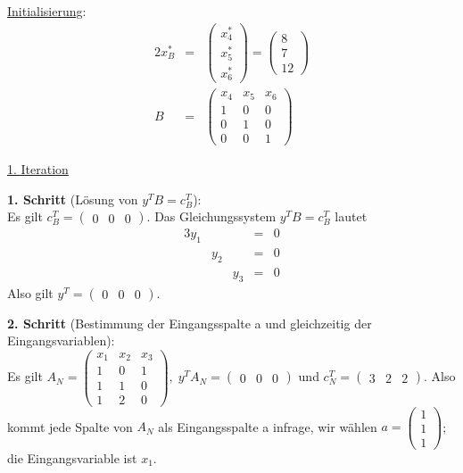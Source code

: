 \documentclass[10pt,a4paper,oneside,ngerman,numbers=noenddot]{scrartcl}
\begin{document}
		\underline{Initialisierung}:
		\begin{alignat*}{2}
			x_{B}^{*} &=& \begin{pmatrix}
				x_{4}^{*} \\
				x_{5}^{*} \\
				x_{6}^{*}
			\end{pmatrix}
			=
			\begin{pmatrix}
				8 \\
				7 \\
				12
			\end{pmatrix} \\
			B &=& \begin{pmatrix}
				x_{4} & x_{5} & x_{6} \\
				1 & 0 & 0 \\
				0 & 1 & 0 \\
				0 & 0 & 1
			\end{pmatrix}
		\end{alignat*}
		
		\underline{1. Iteration}
		
		\textbf{1. Schritt} (Lösung von $y^{T}B = c_{B}^{T}$):\\
		Es gilt $c_{B}^{T} = \begin{pmatrix} 0 & 0 & 0 \end{pmatrix}$. Das Gleichungssystem $y^{T}B = c_{B}^{T}$ lautet
		\begin{alignat*}{3}
			y_{1} & & &=& 0 \\
			& y_{2} & &=& 0 \\
			& & y_{3} &=& 0
		\end{alignat*}
		Also gilt $y^{T} = \begin{pmatrix} 0 & 0 & 0 \end{pmatrix}$.
		
		\textbf{2. Schritt} (Bestimmung der Eingangsspalte a und gleichzeitig der Eingangsvariablen):\\
		Es gilt $A_{N} = \begin{pmatrix} x_{1} & x_{2} & x_{3} \\ 1 & 0 & 1 \\ 1 & 1 & 0 \\ 1 & 2 & 0 \end{pmatrix},\; y^{T}A_{N} = \begin{pmatrix} 0 & 0 & 0 \end{pmatrix}$ und $c_{N}^{T} = \begin{pmatrix} 3 & 2 & 2 \end{pmatrix}$. Also kommt jede Spalte von $A_{N}$ als Eingangsspalte a infrage, wir wählen $a = \begin{pmatrix} 1 \\ 1 \\ 1 \end{pmatrix}$; die Eingangsvariable ist $x_{1}$.
		
\end{document}
